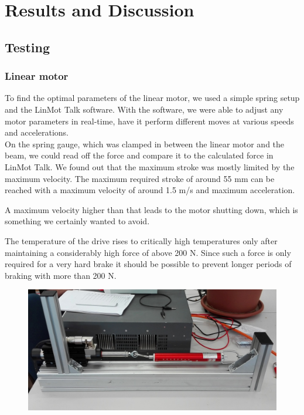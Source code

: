 
\chapter{Results and Discussion}
\label{chp:Results}

\section{Testing}


\subsection{Linear motor}

To find the optimal parameters of the linear motor, we used a simple spring setup and the LinMot Talk software. With the software, we were able to adjust any motor parameters in real-time, have it perform different moves at various speeds and accelerations. \\On the spring gauge, which was clamped in between the linear motor and the beam, we could read off the force and compare it to the calculated force in LinMot Talk. We found out that the maximum stroke was mostly limited by the maximum velocity. The maximum required stroke of around 55 mm can be reached with a maximum velocity of around 1.5 m/s and maximum acceleration.
 
A maximum velocity higher than that leads to the motor shutting down, which is something we certainly wanted to avoid. 
  
The temperature of the drive rises to critically high temperatures only after maintaining a considerably high force of above 200 N. Since such a force is only required for a very hard brake it should be possible to prevent longer periods of braking with more than 200 N. 

\begin{figure}[h]
	\centering
	\includegraphics[width=0.7\linewidth]{pictures_figures/Used/Picture_linmottest}
	\caption{}
	\label{fig:picturelinmottest}
\end{figure}



